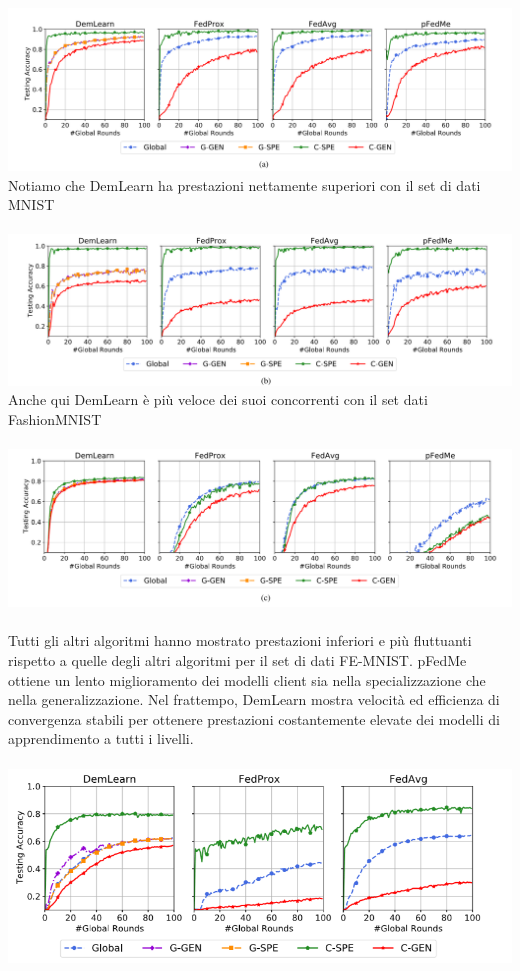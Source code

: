 \includegraphics[scale=0.4]{DemLearnMNIST}\\
Notiamo che DemLearn ha prestazioni nettamente superiori con il set di dati MNIST\\\\
\includegraphics[scale=0.4]{DemLearnFashionMNIST}\\
Anche qui DemLearn è più veloce dei suoi concorrenti con il set dati FashionMNIST\\\\
\includegraphics[scale=0.4]{DemLearnFederatedExtMNIST}\\\\
Tutti gli altri algoritmi hanno mostrato prestazioni inferiori e più fluttuanti rispetto a quelle degli altri algoritmi per il set di dati FE-MNIST. pFedMe ottiene un lento miglioramento dei modelli client sia nella specializzazione che nella generalizzazione. Nel frattempo, DemLearn mostra velocità ed efficienza di convergenza stabili per ottenere prestazioni costantemente elevate dei modelli di apprendimento a tutti i livelli.\\\\
\includegraphics[scale=0.5]{cifar10Comparison}\\\\
